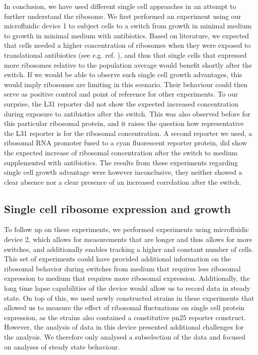 In conclusion, we have used different single cell approaches in an attempt to further understand the ribosome.
%
We first performed an experiment using our microfluidic device 1 to subject cells to a switch from growth in minimal medium to growth in minimal medium with antibiotics.
Based on literature, we expected that cells needed a higher concentration of ribosomes when they were exposed to translational antibiotics (see e.g. ref. \cite{You2013}), and thus that single cells that expressed more ribosomes relative to the population average would benefit shortly after the switch.
%
If we would be able to observe such single cell growth advantages, this would imply 
ribosomes are limiting in this scenario.
Their behaviour could then serve 
as positive control and point of reference for other experiments. 
%
To our surprise, the L31 reporter did not show the expected increased concentration during exposure to antibiotics after the switch.
%
This was also observed before \cite{Walker2016t} for this particular ribosomal protein, and it
raises the question how representative the L31 reporter is for the ribosomal concentration.
%
A second reporter we used, a ribosomal RNA promoter fused to a cyan fluorescent reporter protein, did show the expected increase of ribosomal concentration after the switch to medium supplemented with antibiotics.
%
The results from these experiments regarding single cell growth advantage were however inconclusive, they neither showed a clear absence nor a clear presence of an increased correlation after the switch.

\subsection{Single cell ribosome expression and growth}

To follow up on these experiments, we performed experiments using microfluidic device 2, which allows for measurements that are longer and thus allows for more switches, and additionally enables tracking a higher and constant number of cells. 
%
This set of experiments could have provided additional information on the ribosomal behavior during switches from medium that requires less ribosomal expression to medium that requires more ribosomal expression.%
Additionally, the long time lapse capabilities of the device would allow us to record data in steady state.
On top of this, we used newly constructed strains in these experiments that allowed us to measure the effect of ribosomal fluctuations on single cell protein expression, as the strains also contained a constitutive pn25 reporter construct.
%
However, the analysis of data in this device presented additional challenges for the analysis.
%
We therefore only analysed a subselection of the data 
and focused on analyses of steady state behaviour.

